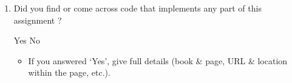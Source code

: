 \begin{enumerate}
    \item Did you find or come across code that implements any part of this assignment ?
          \begin{checkboxes}
              \choice Yes
              \choice No
          \end{checkboxes}
          \begin{itemize}
              \item If you answered `Yes', give full details (book \& page, URL \& location within the page, etc.).
          \end{itemize}
          \begin{tcolorbox}[fit,height=3cm,blank, borderline={1pt}{-2pt},nobeforeafter]
          \end{tcolorbox}
\end{enumerate}